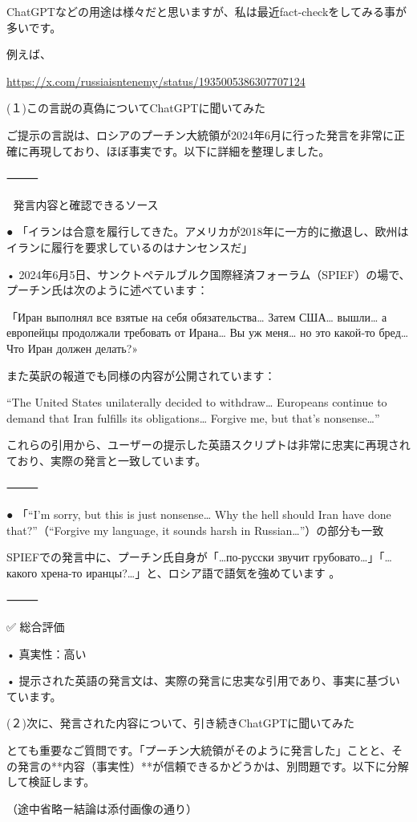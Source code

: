 ChatGPTなどの用途は様々だと思いますが、私は最近fact-checkをしてみる事が多いです。

例えば、

\url{https://x.com/russiaisntenemy/status/1935005386307707124}

(１)この言説の真偽についてChatGPTに聞いてみた

ご提示の言説は、ロシアのプーチン大統領が2024年6月に行った発言を非常に正確に再現しており、ほぼ事実です。以下に詳細を整理しました。

⸻

📌 発言内容と確認できるソース

● 「イランは合意を履行してきた。アメリカが2018年に一方的に撤退し、欧州はイランに履行を要求しているのはナンセンスだ」

• 2024年6月5日、サンクトペテルブルク国際経済フォーラム（SPIEF）の場で、プーチン氏は次のように述べています：

「Иран выполнял все взятые на себя обязательства… Затем США… вышли… а европейцы продолжали требовать от Ирана… Вы уж меня… но это какой‑то бред…Что Иран должен делать?»

また英訳の報道でも同様の内容が公開されています：

“The United States unilaterally decided to withdraw… Europeans continue to demand that Iran fulfills its obligations… Forgive me, but that’s nonsense…”

これらの引用から、ユーザーの提示した英語スクリプトは非常に忠実に再現されており、実際の発言と一致しています。

⸻

● 「“I’m sorry, but this is just nonsense… Why the hell should Iran have done that?”（“Forgive my language, it sounds harsh in Russian…”）の部分も一致

SPIEFでの発言中に、プーチン氏自身が「…по‑русски звучит грубовато…」「…какого хрена‑то иранцы?…」と、ロシア語で語気を強めています  。

⸻

✅ 総合評価

• 真実性：高い

• 提示された英語の発言文は、実際の発言に忠実な引用であり、事実に基づいています。

(２)次に、発言された内容について、引き続きChatGPTに聞いてみた

とても重要なご質問です。「プーチン大統領がそのように発言した」ことと、その発言の**内容（事実性）**が信頼できるかどうかは、別問題です。以下に分解して検証します。

（途中省略ー結論は添付画像の通り）

